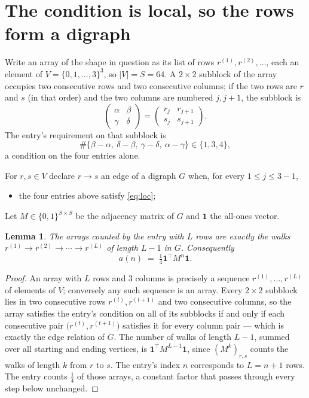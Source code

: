 \documentclass[11pt,a4paper]{article}
\theoremstyle{plain}
\newtheorem{lemma}[theorem]{Lemma}
\theoremstyle{definition}
\begin{document}
\section{The condition is local, so the rows form a digraph}

Write an array of the shape in question as its list of rows
$r^{(1)},r^{(2)},\dots$, each an element of
$V=\{0,1,\dots,3\}^{3}$, so $|V|=S=64$. A $2\times2$ subblock of the array
occupies two consecutive rows and two consecutive columns; if the two rows are $r$
and $s$ (in that order) and the two columns are numbered $j,j+1$,
the subblock is
\[
\begin{pmatrix}\alpha&\beta\\\gamma&\delta\end{pmatrix}=\begin{pmatrix}r_j&r_{j+1}\\s_j&s_{j+1}\end{pmatrix}.
\]
The entry's requirement on that subblock is
\begin{equation}\label{eq:loc}
\#\{\beta-\alpha,\ \delta-\beta,\ \gamma-\delta,\ \alpha-\gamma\}\in\{1,3,4\},
\end{equation}
a condition on the four entries alone.

For $r,s\in V$ declare $r\to s$ an edge of a digraph $G$ when, for every
$1\le j\le 3-1$,
\begin{itemize}
\item the four entries above satisfy \eqref{eq:loc};

\end{itemize}
Let $M\in\{0,1\}^{S\times S}$ be the adjacency matrix of $G$ and $\mathbf{1}$ the
all-ones vector.

\begin{lemma}\label{lem:walk}
The arrays counted by the entry with $L$ rows are exactly the walks
$r^{(1)}\to r^{(2)}\to\cdots\to r^{(L)}$ of length $L-1$ in $G$. Consequently
\[
a(n)\;=\;\tfrac1{4}\mathbf{1}^{\!\top}M^{n}\mathbf{1} .
\]
\end{lemma}

\begin{proof}
An array with $L$ rows and $3$ columns is precisely a sequence
$r^{(1)},\dots,r^{(L)}$ of elements of $V$; conversely any such sequence is an array.
Every $2\times2$ subblock lies in two consecutive rows $r^{(t)},r^{(t+1)}$ and two
consecutive columns, so the array satisfies the entry's condition on all of its subblocks
if and only if each consecutive pair $\bigl(r^{(t)},r^{(t+1)}\bigr)$ satisfies it for
every column pair --- which is exactly the edge relation of $G$. The number of walks of
length $L-1$, summed over all starting and ending vertices, is
$\mathbf{1}^{\!\top}M^{L-1}\mathbf{1}$, since $(M^{k})_{r,s}$ counts the walks of
length $k$ from $r$ to $s$. The entry's index $n$ corresponds to $L=n+1$ rows. The entry counts $\tfrac1{4}$ of those arrays, a constant factor that passes through every step below unchanged.
\end{proof}
\end{document}
